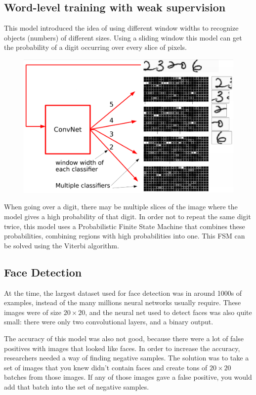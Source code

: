 \subsection{Word-level training with weak supervision}

This model introduced the idea of using different window widths to recognize objects (numbers) of different sizes.
Using a sliding window this model can get the probability of a digit occurring over every slice of pixels.

\begin{figure}[!h]
\centering
	\includegraphics[width=0.5\linewidth]{lectures/04-a/images/word-level.png}
\label{fig:WordLevel}
\end{figure}

When going over a digit, there may be multiple slices of the image where the model gives a high probability of that digit.
In order not to repeat the same digit twice, this model uses a Probabilistic Finite State Machine that combines these probabilities, 
combining regions with high probabilities into one.
This FSM can be solved using the Viterbi algorithm.

\subsection{Face Detection}

At the time, the largest dataset used for face detection was in around 1000s of examples, instead of the many millions neural networks usually require.
These images were of size $20\times20$, and the neural net used to detect faces was also quite small: there were only two convolutional layers, and a binary output.

The accuracy of this model was also not good, because there were a lot of false positives with images that looked like faces.
In order to increase the accuracy, researchers needed a way of finding negative samples.
The solution was to take a set of images that you knew didn't contain faces and create tons of $20\times20$ batches from those images.
If any of those images gave a false positive, you would add that batch into the set of negative samples.

